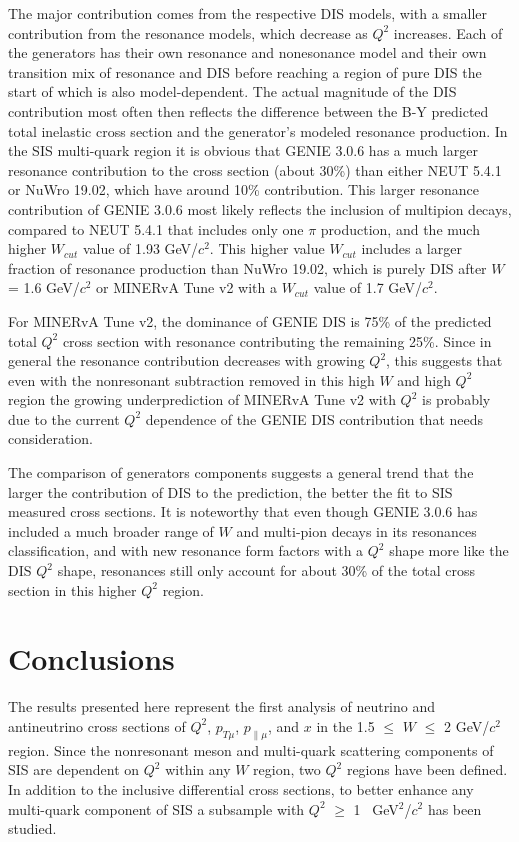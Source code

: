 \documentclass[aps, prd, twocolumn, showpacs, superscriptaddress, floatfix]{revtex4-2}
\begin{document}
The major contribution comes from the respective DIS models, with a smaller contribution from the resonance models, which decrease as $Q^2$ increases. Each of the generators has their own resonance and nonesonance model and their own transition mix of resonance and DIS before reaching a region of pure DIS the start of which is also model-dependent. The actual magnitude of the DIS contribution most often then reflects the difference between the B-Y predicted total inelastic cross section and the generator's modeled resonance production. In the SIS multi-quark region it is obvious that GENIE 3.0.6 has a much larger resonance contribution to the cross section (about 30\%) than either NEUT 5.4.1 or NuWro 19.02, which have around 10\% contribution. This larger resonance contribution of GENIE 3.0.6 most likely reflects the inclusion of multipion decays, compared to NEUT 5.4.1 that includes only one $\pi$ production, and the much higher $W_{cut}$ value of 1.93 GeV/$c^2$. This higher value $W_{cut}$ includes a larger fraction of resonance production than NuWro 19.02, which is purely DIS after $W$ = 1.6 GeV/$c^2$ or MINERvA Tune v2 with a $W_{cut}$ value of 1.7 GeV/$c^2$.

For MINERvA Tune v2, the dominance of GENIE DIS is 75\% of the predicted total $Q^2$ cross section with resonance contributing the remaining 25\%. Since in general the resonance contribution decreases with growing $Q^2$, this suggests that even with the nonresonant subtraction removed in this high $W$ and high $Q^2$ region the growing underprediction of MINERvA Tune v2 with $Q^2$ is probably due to the current $Q^2$ dependence of the GENIE DIS contribution that needs consideration.  

The comparison of generators components suggests a general trend that the larger the contribution of DIS to the prediction, the better the fit to SIS measured cross sections. It is noteworthy that even though GENIE 3.0.6 has included a much broader range of $W$ and multi-pion decays in its resonances classification, and with new resonance form factors with a $Q^2$ shape more like the DIS $Q^2$ shape, resonances still only account for about 30\% of the total cross section in this higher $Q^2$ region.

\section{Conclusions}
The results presented here represent the first analysis of neutrino and antineutrino cross sections of $Q^2$, $p_{T\mu}$, $p_{\parallel\mu}$, and $x$ in the 1.5 $\leq$ $W$ $\leq$ 2 GeV/$c^2$ region. Since the nonresonant meson and multi-quark scattering components of SIS are dependent on $Q^2$ within any $W$ region, two $Q^2$ regions have been defined. In addition to the inclusive differential cross sections, to better enhance any multi-quark component of SIS a subsample with $Q^2$ $\geq$ 1 ~GeV$^2$/$c^2$ has been studied.
\end{document}
